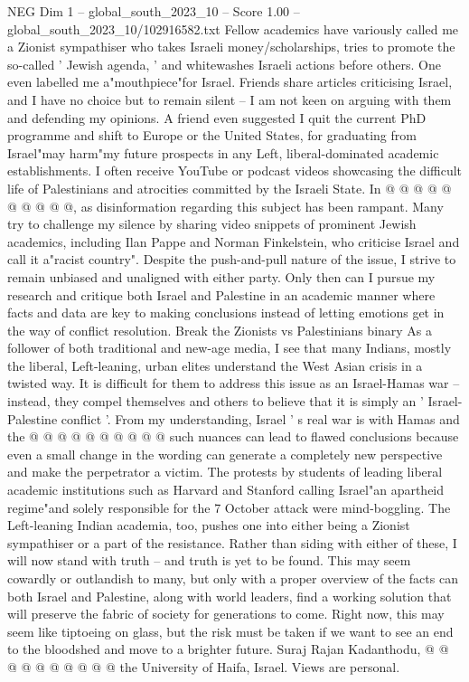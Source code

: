 \begin{textsample}{NEG Dim 1 – global\_south\_2023\_10 – Score 1.00 – global\_south\_2023\_10/102916582.txt}
Fellow academics have variously called me a Zionist sympathiser who takes Israeli money/scholarships, tries to promote the so-called ' Jewish agenda, ' and whitewashes Israeli actions before others.
One even labelled me a"mouthpiece"for Israel.
Friends share articles criticising Israel, and I have no choice but to remain silent -- I am not keen on arguing with them and defending my opinions.
A friend even suggested I quit the current PhD programme and shift to Europe or the United States, for graduating from Israel"may harm"my future prospects in any Left, liberal-dominated academic establishments.
I often receive YouTube or podcast videos showcasing the difficult life of Palestinians and atrocities committed by the Israeli State.
In @ @ @ @ @ @ @ @ @ @, as disinformation regarding this subject has been rampant.
Many try to challenge my silence by sharing video snippets of prominent Jewish academics, including Ilan Pappe and Norman Finkelstein, who criticise Israel and call it a"racist country".
Despite the push-and-pull nature of the issue, I strive to remain unbiased and unaligned with either party.
Only then can I pursue my research and critique both Israel and Palestine in an academic manner where facts and data are key to making conclusions instead of letting emotions get in the way of conflict resolution.
Break the Zionists vs Palestinians binary As a follower of both traditional and new-age media, I see that many Indians, mostly the liberal, Left-leaning, urban elites understand the West Asian crisis in a twisted way.
It is difficult for them to address this issue as an Israel-Hamas war -- instead, they compel themselves and others to believe that it is simply an ' Israel-Palestine conflict '.
From my understanding, Israel ' s real war is with Hamas and the @ @ @ @ @ @ @ @ @ @ such nuances can lead to flawed conclusions because even a small change in the wording can generate a completely new perspective and make the perpetrator a victim.
The protests by students of leading liberal academic institutions such as Harvard and Stanford calling Israel"an apartheid regime"and solely responsible for the 7 October attack were mind-boggling.
The Left-leaning Indian academia, too, pushes one into either being a Zionist sympathiser or a part of the resistance.
Rather than siding with either of these, I will now stand with truth -- and truth is yet to be found.
This may seem cowardly or outlandish to many, but only with a proper overview of the facts can both Israel and Palestine, along with world leaders, find a working solution that will preserve the fabric of society for generations to come.
Right now, this may seem like tiptoeing on glass, but the risk must be taken if we want to see an end to the bloodshed and move to a brighter future.
Suraj Rajan Kadanthodu, @ @ @ @ @ @ @ @ @ @ the University of Haifa, Israel.
Views are personal.

\end{textsample}
